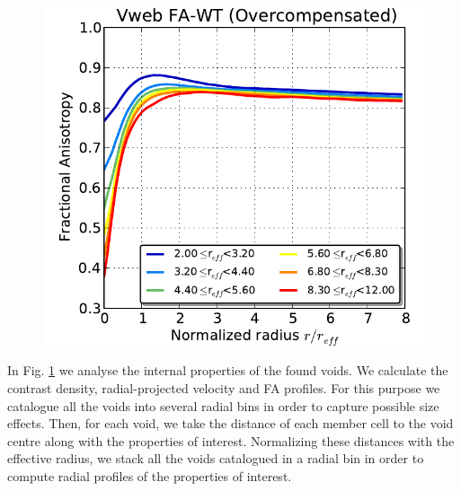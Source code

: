 \documentclass[a4,useAMS,usenatbib,usegraphicx]{latex/mn2e}
\begin{document}
\begin{figure}
  \includegraphics[trim = 1mm 0mm 5mm 0mm, clip, keepaspectratio=true,
  width=0.24\textheight]{./figures/voids_FA_VwebFAG1.pdf}  
  


  \label{fig:RhoVel}
  \vspace{0.1 cm}

\end{figure}


In Fig. \ref{fig:RhoVel} we analyse the internal properties of the found 
voids. We calculate the contrast density, radial-projected velocity and 
FA profiles. For this purpose we catalogue all the voids into several 
radial bins in order to capture possible size effects. Then, for each void, 
we take the distance of each member cell to the void centre along with the 
properties of interest. Normalizing these distances with the effective 
radius, we stack all the voids catalogued in a radial bin in order to 
compute radial profiles of the properties of interest.


\end{document}
